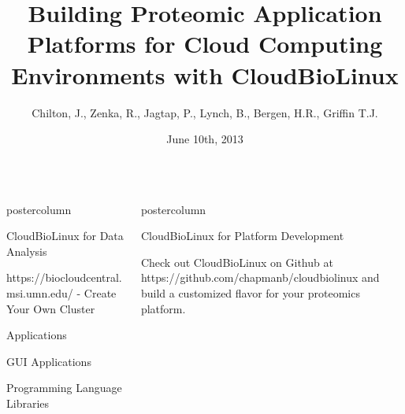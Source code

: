 \documentclass[final]{beamer}
\title{\huge Building Proteomic Application Platforms for Cloud Computing Environments with CloudBioLinux}
\author[Chilton, Zenka, et al]{Chilton, J., Zenka, R., Jagtap, P., Lynch, B., Bergen, H.R., Griffin T.J.}
\institute[]{University of Minnesota Supcomputing Institute}
\date{June 10th, 2013}
\newlength{\columnheight}
\begin{document}
\begin{frame}
  \begin{columns}

    \begin{column}{.5\textwidth}
      \begin{beamercolorbox}[center,wd=\textwidth]{postercolumn}
        \begin{minipage}[T]{.95\textwidth}  %
          \parbox[t][\columnheight]{\textwidth}{
            \begin{block}{CloudBioLinux for Data Analysis}
            
            \end{block}
            \vfill
            \begin{block}{https://biocloudcentral.msi.umn.edu/ - Create Your Own Cluster}

            \end{block}
            \vfill
            \begin{block}{Applications}

            \end{block}            
            \vfill
            \begin{block}{GUI Applications}

            \end{block}
            \vfill
            \begin{block}{Programming Language Libraries}

            \end{block}
          }
        \end{minipage}
      \end{beamercolorbox}
    \end{column}

    \begin{column}{.5\textwidth}
      \begin{beamercolorbox}[center,wd=\textwidth]{postercolumn}
        \begin{minipage}[T]{.95\textwidth} %
          \parbox[t][\columnheight]{\textwidth}{
            \begin{block}{CloudBioLinux for Platform Development}

            Check out CloudBioLinux on Github at
            https://github.com/chapmanb/cloudbiolinux and build a customized
            flavor for your proteomics platform.
            
            \end{block}

}
\end{minipage}
\end{beamercolorbox}
\end{column}
\end{columns}
\end{frame}
\end{document}

